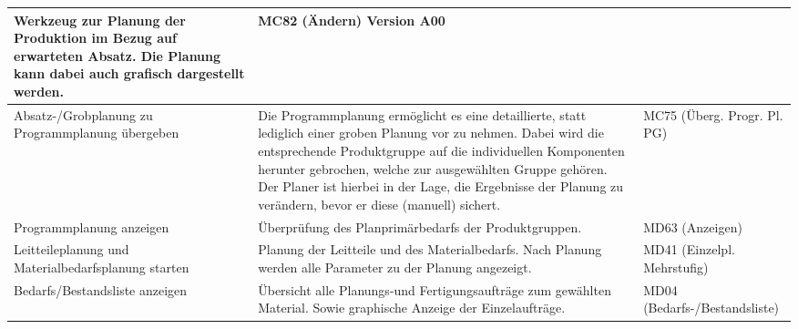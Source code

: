 \begin{tabular}{|L{3.5cm}L{9cm}L{3.5cm}|}
Werkzeug zur Planung der Produktion im Bezug auf erwarteten Absatz.
Die Planung kann dabei auch grafisch dargestellt werden. & MC82 (Ändern)
Version A00 \\ \hline
Absatz-/Grobplanung zu Programmplanung übergeben & Die Programmplanung ermöglicht es eine detaillierte, statt lediglich einer groben Planung vor zu nehmen. Dabei wird die entsprechende Produktgruppe auf die individuellen Komponenten herunter gebrochen, welche zur ausgewählten Gruppe gehören. Der Planer ist hierbei in der Lage, die Ergebnisse der Planung zu verändern, bevor er diese (manuell) sichert. & MC75 (Überg. Progr. Pl. PG) \\ \hline
Programmplanung anzeigen & Überprüfung des Planprimärbedarfs der Produktgruppen.  & MD63 (Anzeigen) \\ \hline
Leitteileplanung und Materialbedarfsplanung starten & Planung der Leitteile und des Materialbedarfs. Nach Planung werden alle Parameter zu der Planung angezeigt. & MD41 (Einzelpl. Mehrstufig) \\ \hline
Bedarfs/Bestandsliste anzeigen & Übersicht alle Planungs-und Fertigungsaufträge zum gewählten Material. Sowie graphische Anzeige der Einzelaufträge.
 & MD04 (Bedarfs-/Bestandsliste) \\ \hline
 \end{tabular}


